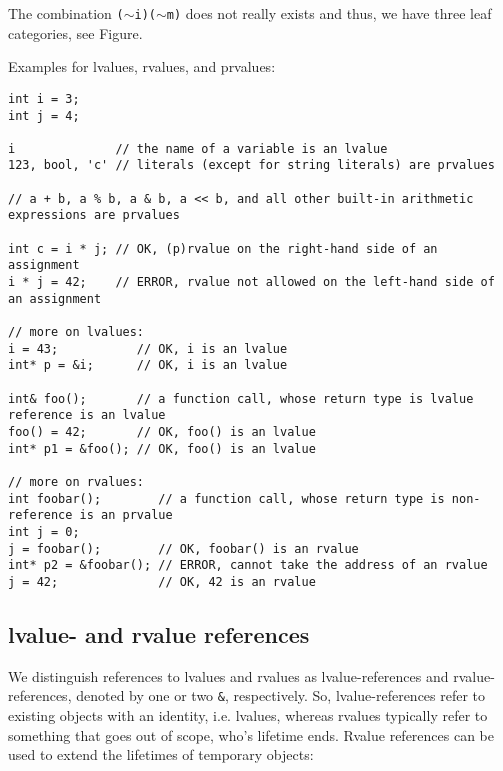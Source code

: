 The combination \texttt{($\sim$i)($\sim$m)} does not really exists and thus, we have three leaf categories, see Figure.

Examples for lvalues, rvalues, and prvalues:
\begin{verbatim}
int i = 3;
int j = 4;

i              // the name of a variable is an lvalue
123, bool, 'c' // literals (except for string literals) are prvalues

// a + b, a % b, a & b, a << b, and all other built-in arithmetic expressions are prvalues

int c = i * j; // OK, (p)rvalue on the right-hand side of an assignment
i * j = 42;    // ERROR, rvalue not allowed on the left-hand side of an assignment

// more on lvalues:
i = 43;           // OK, i is an lvalue
int* p = &i;      // OK, i is an lvalue

int& foo();       // a function call, whose return type is lvalue reference is an lvalue
foo() = 42;       // OK, foo() is an lvalue
int* p1 = &foo(); // OK, foo() is an lvalue

// more on rvalues:
int foobar();        // a function call, whose return type is non-reference is an prvalue
int j = 0;
j = foobar();        // OK, foobar() is an rvalue
int* p2 = &foobar(); // ERROR, cannot take the address of an rvalue
j = 42;              // OK, 42 is an rvalue
\end{verbatim}


\subsection{lvalue- and rvalue references}
We distinguish references to lvalues and rvalues as lvalue-references and rvalue-references, denoted by one or two \texttt{\&}, respectively. So,
lvalue-references refer to existing objects with an identity, i.e. lvalues, whereas rvalues typically refer to something that goes out of scope, who's
lifetime ends. Rvalue references can be used to extend the lifetimes of temporary objects:

